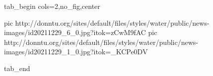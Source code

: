  
 
 
 
 

\ifcmt
  tab_begin cols=2,no_fig,center

     pic http://donntu.org/sites/default/files/styles/water/public/news-images/id20211229_6_0.jpg?itok=zCwM9fAC
		 pic http://donntu.org/sites/default/files/styles/water/public/news-images/id20211229_1_0.jpg?itok=_KCPe0DV

  tab_end
\fi
